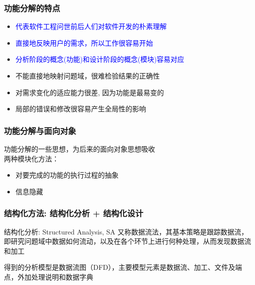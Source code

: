\documentclass[compress]{beamer}
\begin{document}
\begin{frame}
\frametitle{功能分解的特点}
\begin{itemize}
\item \textcolor{blue}{代表软件工程问世前后人们对软件开发的朴素理解}
\item \textcolor{blue}{直接地反映用户的需求，所以工作很容易开始}
\item \textcolor{blue}{分析阶段的概念(功能)和设计阶段的概念(模块)容易对应}
\item 不能直接地映射问题域，很难检验结果的正确性
\item 对需求变化的适应能力很差, 因为功能是最易变的
\item 局部的错误和修改很容易产生全局性的影响
\end{itemize}

\end{frame}

\begin{frame}
    \frametitle{功能分解与面向对象}

功能分解的一些思想，为后来的面向对象思想吸收 \\

两种模块化方法： 

\begin{itemize}
    \item 对要完成的功能的执行过程的抽象
    \item 信息隐藏
\end{itemize}

\end{frame}




\begin{frame}
\frametitle{结构化方法: 结构化分析 + 结构化设计}
\begin{block}{结构化分析: Structured Analysis, SA}
又称数据流法，其基本策略是跟踪数据流，即研究问题域中数据如何流动，以及在各个环节上进行何种处理，从而发现数据流和加工

得到的分析模型是数据流图（DFD），主要模型元素是数据流、加工、文件及端点，外加处理说明和数据字典
\end{block}
\end{frame}
\end{document}

